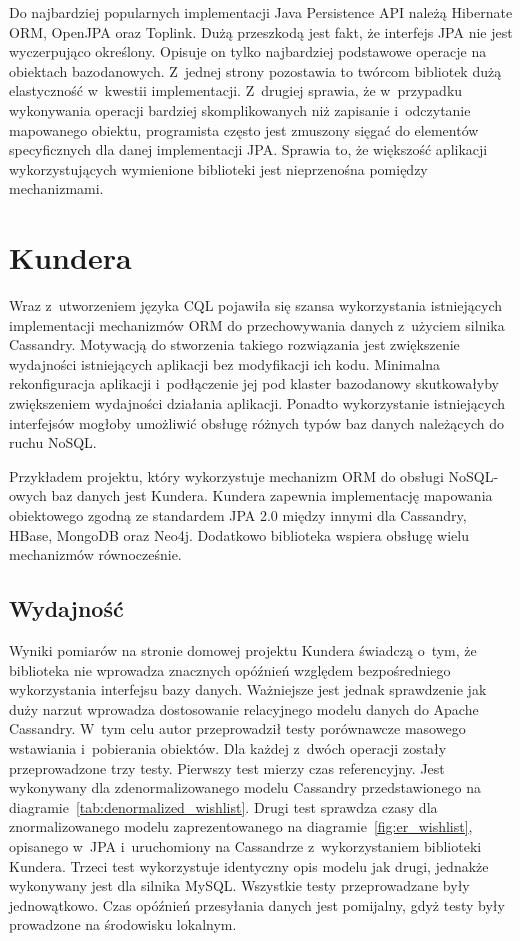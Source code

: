 Do najbardziej popularnych implementacji Java Persistence API należą Hibernate ORM, OpenJPA oraz Toplink. Dużą przeszkodą jest fakt, że interfejs JPA nie jest wyczerpująco określony. Opisuje on tylko najbardziej podstawowe operacje na obiektach bazodanowych. Z~jednej strony pozostawia to twórcom bibliotek dużą elastyczność w~kwestii implementacji. Z~drugiej sprawia, że w~przypadku wykonywania operacji bardziej skomplikowanych niż zapisanie i~odczytanie mapowanego obiektu, programista często jest zmuszony sięgać do elementów specyficznych dla danej implementacji JPA. Sprawia to, że większość aplikacji wykorzystujących wymienione biblioteki jest nieprzenośna pomiędzy mechanizmami.

\section{Kundera}
\label{sec:kundera}

Wraz z~utworzeniem języka CQL pojawiła się szansa wykorzystania istniejących implementacji mechanizmów ORM do przechowywania danych z~użyciem silnika Cassandry. Motywacją do stworzenia takiego rozwiązania jest zwiększenie wydajności istniejących aplikacji bez modyfikacji ich kodu. Minimalna rekonfiguracja aplikacji i~podłączenie jej pod klaster bazodanowy skutkowałyby zwiększeniem wydajności działania aplikacji. Ponadto wykorzystanie istniejących interfejsów mogłoby umożliwić obsługę różnych typów baz danych należących do ruchu NoSQL. 

Przykładem projektu, który wykorzystuje mechanizm ORM do obsługi NoSQL-owych baz danych jest Kundera.\cite{kundera_home} Kundera zapewnia implementację mapowania obiektowego zgodną ze standardem JPA 2.0 między innymi dla Cassandry, HBase, MongoDB oraz Neo4j. Dodatkowo biblioteka wspiera obsługę wielu mechanizmów równocześnie.

\subsection{Wydajność}
\label{sec:kundera_performance}

Wyniki pomiarów na stronie domowej projektu Kundera świadczą o~tym, że biblioteka nie wprowadza znacznych opóźnień względem bezpośredniego wykorzystania interfejsu bazy danych. Ważniejsze jest jednak sprawdzenie jak duży narzut wprowadza dostosowanie relacyjnego modelu danych do Apache Cassandry. W~tym celu autor przeprowadził testy porównawcze masowego wstawiania i~pobierania obiektów. Dla każdej z~dwóch operacji zostały przeprowadzone trzy testy. Pierwszy test mierzy czas referencyjny. Jest wykonywany dla zdenormalizowanego modelu Cassandry przedstawionego na diagramie~\ref{tab:denormalized_wishlist}. Drugi test sprawdza czasy dla znormalizowanego modelu zaprezentowanego na diagramie~\ref{fig:er_wishlist}, opisanego w~JPA i~uruchomiony na Cassandrze z~wykorzystaniem biblioteki Kundera. Trzeci test wykorzystuje identyczny opis modelu jak drugi, jednakże wykonywany jest dla silnika MySQL. Wszystkie testy przeprowadzane były jednowątkowo. Czas opóźnień przesyłania danych jest pomijalny, gdyż testy były prowadzone na środowisku lokalnym.

